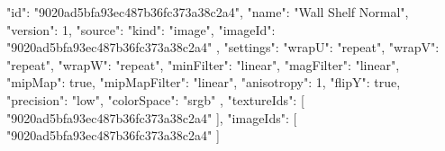 {
  "id": "9020ad5bfa93ec487b36fc373a38c2a4",
  "name": "Wall Shelf Normal",
  "version": 1,
  "source": {
    "kind": "image",
    "imageId": "9020ad5bfa93ec487b36fc373a38c2a4"
  },
  "settings": {
    "wrapU": "repeat",
    "wrapV": "repeat",
    "wrapW": "repeat",
    "minFilter": "linear",
    "magFilter": "linear",
    "mipMap": true,
    "mipMapFilter": "linear",
    "anisotropy": 1,
    "flipY": true,
    "precision": "low",
    "colorSpace": "srgb"
  },
  "textureIds": [
    "9020ad5bfa93ec487b36fc373a38c2a4"
  ],
  "imageIds": [
    "9020ad5bfa93ec487b36fc373a38c2a4"
  ]
}

